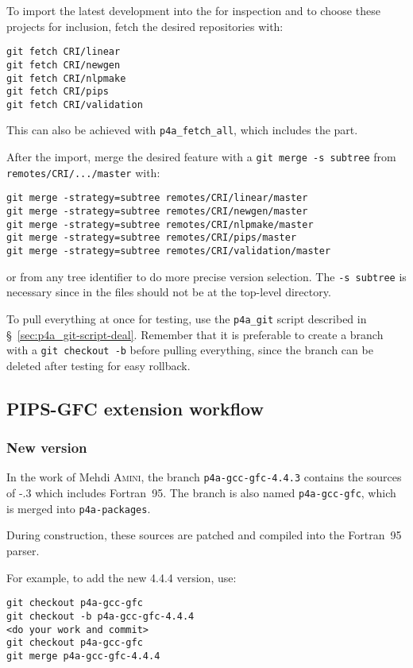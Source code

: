 \documentclass[a4paper]{article}
\begin{document}
To import the latest \Apips development into the \Apfa{} \Agit for
inspection and to choose these projects for inclusion, fetch the
desired repositories with:
\begin{verbatim}
git fetch CRI/linear
git fetch CRI/newgen
git fetch CRI/nlpmake
git fetch CRI/pips
git fetch CRI/validation
\end{verbatim}
This can also be achieved with \verb|p4a_fetch_all|, which includes the
\Apolylib part.

After the import, merge the desired feature with a \texttt{git merge -s
  subtree} from \texttt{remotes/CRI/.../master} with:
\begin{verbatim}
git merge -strategy=subtree remotes/CRI/linear/master
git merge -strategy=subtree remotes/CRI/newgen/master
git merge -strategy=subtree remotes/CRI/nlpmake/master
git merge -strategy=subtree remotes/CRI/pips/master
git merge -strategy=subtree remotes/CRI/validation/master
\end{verbatim}
or from any tree identifier to do more precise version selection. The
\texttt{-s subtree} is necessary since in \Apfa the \Apips files
should not be
at the top-level directory.

To pull everything at once for testing, use the
\verb|p4a_git| script described in
\S~\ref{sec:p4a_git-script-deal}. Remember that
it is preferable to create a branch with a \texttt{git checkout
  -b} before pulling everything, since the branch can be deleted after
testing for easy rollback.


\subsection{PIPS-GFC extension workflow}
\label{sec:pips-gfc-workflow}

\subsubsection{New version}
\label{sec:new-version}

In the work of Mehdi \textsc{Amini}, the branch
\texttt{p4a-gcc-gfc-4.4.3} contains the sources of \Agcc-.3
which includes Fortran~95. The branch is also named \texttt{p4a-gcc-gfc},
which is merged into \texttt{p4a-packages}.

During \Apfa construction, these sources are patched and compiled into the
\Apips Fortran~95 parser.

For example, to add the new 4.4.4 version, use:
\begin{verbatim}
git checkout p4a-gcc-gfc
git checkout -b p4a-gcc-gfc-4.4.4
<do your work and commit>
git checkout p4a-gcc-gfc
git merge p4a-gcc-gfc-4.4.4
\end{verbatim}
\end{document}
